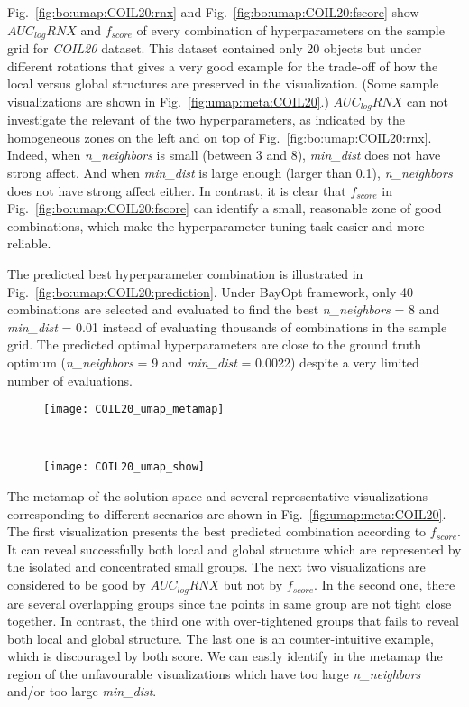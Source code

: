 Fig.~\ref{fig:bo:umap:COIL20:rnx} and Fig.~\ref{fig:bo:umap:COIL20:fscore} show $AUC_{log}RNX$ and $f_{score}$ of every combination of hyperparameters on the sample grid for \emph{COIL20} dataset.
This dataset contained only 20 objects but under different rotations that gives a very good example for the trade-off of how the local versus global structures are preserved in the visualization.
(Some sample visualizations are shown in Fig.~\ref{fig:umap:meta:COIL20}.)
$AUC_{log}RNX$ can not investigate the relevant of the two hyperparameters, as indicated by the homogeneous zones on the left and on top of Fig.~\ref{fig:bo:umap:COIL20:rnx}.
Indeed, when \emph{n\_neighbors} is small (between 3 and 8), \emph{min\_dist} does not have strong affect. And when \emph{min\_dist} is large enough (larger than 0.1), \emph{n\_neighbors} does not have strong affect either.
In contrast, it is clear that $f_{score}$ in Fig.~\ref{fig:bo:umap:COIL20:fscore} can identify a small, reasonable zone of good combinations, which make the hyperparameter tuning task easier and more reliable.

The predicted best hyperparameter combination is illustrated in Fig.~\ref{fig:bo:umap:COIL20:prediction}.
Under BayOpt framework, only 40 combinations are selected and evaluated to find the best \emph{n\_neighbors} = 8 and \emph{min\_dist} = 0.01 instead of evaluating thousands of combinations in the sample grid.
The predicted optimal hyperparameters are close to the ground truth optimum (\emph{n\_neighbors} = 9 and \emph{min\_dist} = 0.0022) despite a very limited number of evaluations.

\begin{figure*}[ht!]
    \centering
    \begin{subfigure}[b]{.8\linewidth}
        \centering
        \texttt{[image: COIL20\_umap\_metamap]}
    \end{subfigure}
    ~
    \begin{subfigure}[b]{.8\linewidth}
        \texttt{[image: COIL20\_umap\_show]}
    \end{subfigure}
    \caption{Metamaps and sample visualizations with selected hyperparameters for \emph{COIL20} dataset.}
    \label{fig:umap:meta:COIL20}
\end{figure*}

The metamap of the solution space and several representative visualizations corresponding to different scenarios are shown in Fig.~\ref{fig:umap:meta:COIL20}.
The first visualization presents the best predicted combination according to $f_{score}$.
It can reveal successfully both local and global structure which are represented by the isolated and concentrated small groups.
The next two visualizations are considered to be good by $AUC_{log}RNX$ but not by $f_{score}$.
In the second one, there are several overlapping groups since the points in same group are not tight close together.
In contrast, the third one with over-tightened groups that fails to reveal both local and global structure.
The last one is an counter-intuitive example, which is discouraged by both score.
We can easily identify in the metamap the region of the unfavourable visualizations which have too large \emph{n\_neighbors} and/or too large \emph{min\_dist}.

